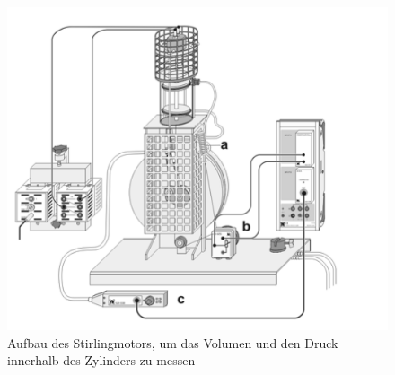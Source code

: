 \documentclass[11pt]{scrartcl}
\begin{document}
\begin{figure}[H]
    \centering
    \includegraphics[width=0.8\linewidth]{pics/Motoraufbau.png}
    \caption{Aufbau des Stirlingmotors, um das Volumen und den Druck innerhalb
    des Zylinders zu messen}%
    \label{fig:Motoraufbau}
\end{figure}
    
\end{document}
